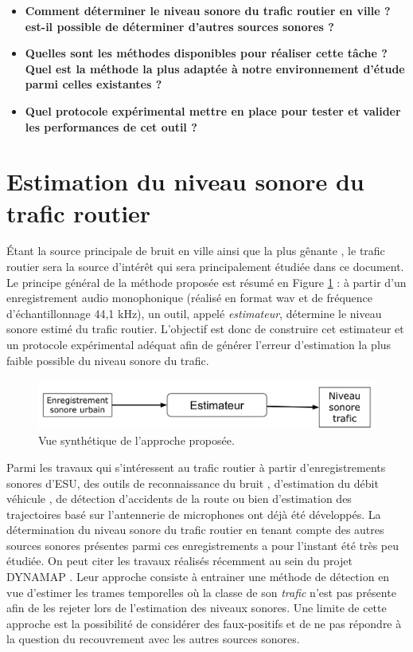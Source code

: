 \begin{itemize}
\item \textbf{Comment déterminer le niveau sonore du trafic routier en ville ? est-il possible de déterminer d'autres sources sonores ?}
\item \textbf{Quelles sont les méthodes disponibles pour réaliser cette tâche ? Quel est la méthode la plus adaptée à notre environnement d'étude parmi celles existantes ?}
\item \textbf{Quel protocole expérimental mettre en place pour tester et valider les performances de cet outil ?}
\end{itemize}

\section{Estimation du niveau sonore du trafic routier} \label{part:cachier_charges}

Étant la source principale de bruit en ville ainsi que la plus gênante \cite{noauthor_noise_nodate}, le trafic routier sera la source d'intérêt qui sera principalement étudiée dans ce document. Le principe général de la méthode proposée est résumé en Figure \ref{fig:estimateur0} : à partir d'un enregistrement audio monophonique (réalisé en format wav et de fréquence d'échantillonnage 44,1 kHz), un outil, appelé \textit{estimateur}, détermine le niveau sonore estimé du trafic routier.
L'objectif est donc de construire cet estimateur et un protocole expérimental adéquat afin de générer l'erreur d'estimation la plus faible possible du niveau sonore du trafic.\\

\begin{figure}[ht]
\centering
\includegraphics[width=0.7\linewidth]{./figures/NMF/bloc_diagram_estimateur0.pdf}
\caption{Vue synthétique de l'approche proposée.}
\label{fig:estimateur0}
\end{figure}

Parmi les travaux qui s'intéressent au trafic routier à partir d'enregistrements sonores d'ESU,  des outils de reconnaissance du bruit \cite{defreville_automatic_2006}, d'estimation du débit véhicule \cite{torija2012using}, de détection d'accidents de la route \cite{harlow2001automated} ou bien d'estimation des trajectoires  basé sur l'antennerie de microphones \cite{leiba2017large} ont déjà été développés.
La détermination du niveau sonore du trafic routier en tenant compte des autres sources sonores présentes parmi ces enregistrements a pour l'instant été très peu étudiée. On peut citer les travaux réalisés récemment au sein du projet DYNAMAP \cite{socoro2017anomalous}. Leur approche consiste à entrainer une méthode de détection en vue d'estimer les trames temporelles où la classe de son \textit{trafic} n'est pas présente afin de les rejeter lors de l'estimation des niveaux sonores. Une limite de cette approche est la possibilité de considérer des faux-positifs et de ne pas répondre à la question du recouvrement avec les autres sources sonores.

